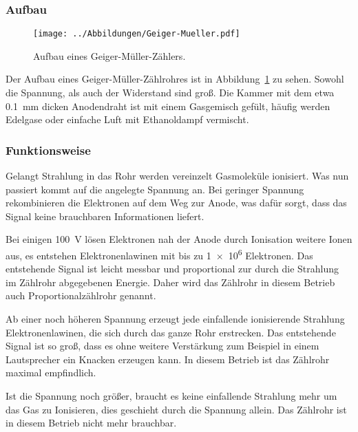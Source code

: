 \parencite[Abschnitt~9.3.2]{meschede-gerthsen_24}

\parencite[Abschnitt~19.3.2~d)]{meschede-gerthsen_24}

\FloatBarrier
\subsubsection{Aufbau}

\begin{figure}[htpb]
    \centering
    \texttt{[image: ../Abbildungen/Geiger-Mueller.pdf]}
    \caption{%
        Aufbau eines Geiger-Müller-Zählers.
    }
    \label{fig:geiger}
\end{figure}

Der Aufbau eines Geiger-Müller-Zählrohres ist in Abbildung~\ref{fig:geiger} 
zu sehen. Sowohl die Spannung, als auch der Widerstand sind groß. Die 
Kammer mit dem etwa \SI{0.1}{\milli\meter} dicken Anodendraht ist mit einem 
Gasgemisch gefült, häufig werden Edelgase oder einfache Luft mit 
Ethanoldampf vermischt.

\FloatBarrier
\subsubsection{Funktionsweise}

Gelangt Strahlung in das Rohr werden vereinzelt Gasmoleküle ionisiert. Was
nun passiert kommt auf die angelegte Spannung an. Bei geringer Spannung
rekombinieren die Elektronen auf dem Weg zur Anode, was dafür sorgt, dass das
Signal keine brauchbaren Informationen liefert.

Bei einigen \SI{100}{\volt} lösen Elektronen nah der Anode durch Ionisation
weitere Ionen aus, es entstehen Elektronenlawinen mit bis zu \num{1e6}
Elektronen. Das entstehende Signal ist leicht messbar und proportional zur
durch die Strahlung im Zählrohr abgegebenen Energie. Daher wird das
Zählrohr in diesem Betrieb auch Proportionalzählrohr genannt.

Ab einer noch höheren Spannung erzeugt jede einfallende ionisierende
Strahlung Elektronenlawinen, die sich durch das ganze Rohr erstrecken. Das
entstehende Signal ist so groß, dass es ohne weitere Verstärkung zum
Beispiel in einem Lautsprecher ein Knacken erzeugen kann. In diesem Betrieb ist
das Zählrohr maximal empfindlich.

Ist die Spannung noch größer, braucht es keine einfallende Strahlung mehr um
das Gas zu Ionisieren, dies geschieht durch die Spannung allein. Das
Zählrohr ist in diesem Betrieb nicht mehr brauchbar.

